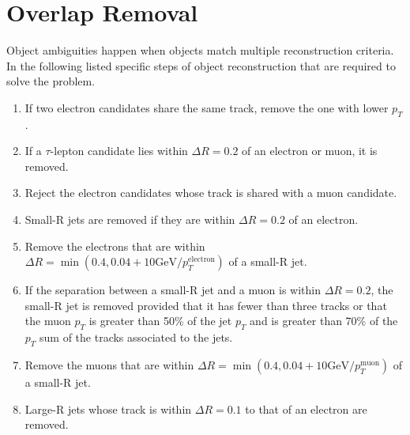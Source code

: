 \documentclass[class=NCU_thesis, crop=false]{standalone}
\begin{document}
\section{Overlap Removal}
	Object ambiguities happen when objects match multiple reconstruction criteria. In the following listed specific steps of object reconstruction that are required to solve the problem.
	\begin{enumerate}
		\item If two electron candidates share the same track, remove the one with lower $p_T$.
		\item If a $\tau$-lepton candidate lies within $\Delta R = 0.2$ of an electron or muon, it is removed.
		\item Reject the electron candidates whose track is shared with a muon candidate.
		\item Small-R jets are removed if they are within $\Delta R = 0.2$ of an electron.
		\item Remove the electrons that are within $\Delta R = \min(0.4, 0.04 + 10 \mathrm{GeV} / p_T^{\mathrm{electron}})$ of a small-R jet.
		\item If the separation between a small-R jet and a muon is within $\Delta R = 0.2$, the small-R jet is removed provided that it has fewer than three tracks or that the muon $p_T$ is greater than 50\% of the jet $p_T$ and is greater than 70\% of the $p_T$ sum of the tracks associated to the jets.
		\item Remove the muons that are within $\Delta R = \min(0.4, 0.04 + 10 \mathrm{GeV} / p_T^{\mathrm{muon}})$ of a small-R jet.
		\item Large-R jets whose track is within $\Delta R = 0.1$ to that of an electron are removed.
	\end{enumerate}
\end{document}
